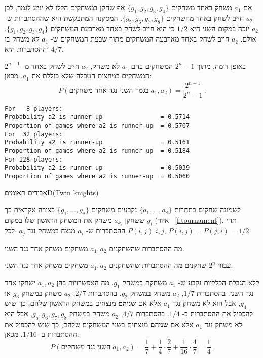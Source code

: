 \newpage

\solution{}

אם 
$a_1$
משחק באחד משחקים
$\{g_1,g_2,g_3,g_4\}$
אף שחקן במשחקים הללו לא יגיע לגמר, לכן 
$a_2$
חייב לשחק באחד מהשחקים
$\{g_5,g_6,g_7,g_8\}$.
המסקנה המתבקשת היא שההסתברות ש-%
$a_2$
יזכה במקום השני היא
$1/2$
כי הוא חייב לשחק באחד מארבעת המשחקים
$\{g_1,g_2,g_3,g_4\}$.
אולם, 
$a_2$
חייב לשחק באחד מארבעה המשחקים מתוך שבעת המשחקים ש-%
$a_1$
לא משחק בו וההסתברות היא
$4/7$.

באופן דומה, מתוך
$2^n-1$
המשחקים בהם 
$a_1$
לא משחק, 
$a_2$
חייב לשחק באחד מ-%
$2^{n-1}$
המשחקים במחצית הטבלה שלא כוללת את
$a_1$.
מכאן:
\[
P(\textrm{בגמר השני נגד אחד משחקים} \; a_1,a_2)=\frac{2^{n-1}}{2^n-1}\,.
\]

\sml{}
\begin{verbatim}
For   8 players:
Probability a2 is runner-up                = 0.5714
Proportion of games where a2 is runner-up  = 0.5707
For  32 players:
Probability a2 is runner-up                = 0.5161
Proportion of games where a2 is runner-up  = 0.5184
For 128 players:
Probability a2 is runner-up                = 0.5039
Proportion of games where a2 is runner-up  = 0.5060
\end{verbatim}


\begin{prob}{אבירים תאומים}{D}{(Twin knights)}

לשמונה שחקים בתחרות 
$\{a_1,\ldots,a_8\}$
נקבעים משחקים 
$\{g_1,\ldots,g_8\}$
בצורה אקראית כך ששחקן
$a_{k_{i}}$
משחק את המשחק הראשון שלו במקום
$g_{i}$
(איור%
~\ref{f.tournament}).
תהי
$P(i,j)$
ההסתברות ש-%
$a_i$
מנצח במשחק נגד 
$a_j$.
לכל
$i,j$, $P(i,j)=P(j,i)=1/2$.

מה ההסתברות שהשחקנים
$a_1,a_2$
משחקים משחק אחד נגד השני.

עבור
$2^n$ 
שחקנים מה ההסתברות שהשחקנים
$a_1,a_2$
משחקים משחק אחד נגד השני.
\end{prob}

\solution{}

ללא הגבלת הכלליות נקבע ש-%
$a_1$
משחקת במשחק
$g_1$.
מה האפשרויות בהן 
$a_1,a_2$
ישחקו אחד נגד השני. בהסתברות 
$1/7$,
$a_2$
משחק במשחק
$g_2$.
בהסתברות
$2/7$,
$a_2$
משחק במשחק 
$g_3$
או
$g_4$,
אבל הוא לא משחק נגד 
$a_1$
אלא אם
\textbf{שניהם}
מנצחים במשחק הראשון שלהם, כך שיש להכפיל את ההסתברות ב-%
$1/4$.
בהסתברות
$4/7$,
$a_2$
משחק במשחק
$g_5,g_6,g_7,g_8$, 
אבל הוא לא משחק נגד 
$a_1$
אלא אם
\textbf{שניהם}
מנצחים בשני המשחקים שלהם, כך שיש להכפיל את ההסתברות ב-%
$1/16$.
מכאן:
\[
P(\textrm{השני נגד משחקים}\;a_1, a_2)=\frac{1}{7} + \frac{1}{4}\cdot \frac{2}{7} + \frac{1}{16}\cdot \frac{4}{7} =\frac{1}{4}\,.
\]


